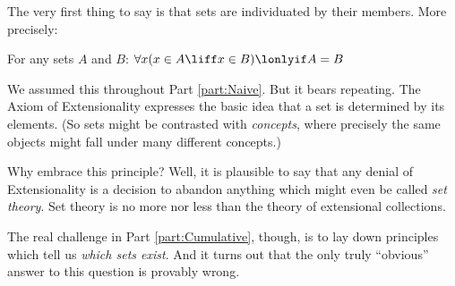 \documentclass[../../../include/open-logic-section]{subfiles}
\begin{document}
	
	
The very first thing to say is that sets are individuated by their members. More precisely:
	\begin{axiom*}[Extensionality]
		For any sets $A$ and $B$: $\forall x(x \in A \liff x \in B) \lonlyif A = B$
	\end{axiom*}\noindent 
	We assumed this throughout Part \ref{part:Naive}. But it bears repeating. The Axiom of Extensionality expresses the basic idea that a set is determined by its elements. (So sets might be contrasted with \emph{concepts}, where precisely the same objects might fall under many different concepts.) 
	
	Why embrace this principle? Well, it is plausible to say that any denial of Extensionality is a decision to abandon anything which might even be called \emph{set theory}. Set theory is no more nor less than the theory of extensional collections. 
	
	The real challenge in Part \ref{part:Cumulative}, though, is to lay down principles which tell us \emph{which sets exist}. And it turns out that the only truly ``obvious'' answer to this question is provably wrong.
	
\end{document}
